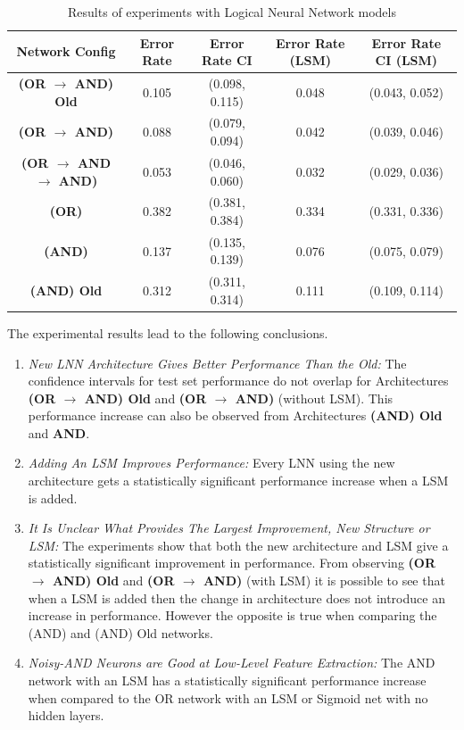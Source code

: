 \begin{table}[H]
	\begin{center}
		\begin{tabular}{| c | c | c | c | c |}
			\hline
			\textbf{Network Config} & \textbf{Error Rate} & \textbf{Error Rate CI} & \textbf{Error Rate (LSM)} & \textbf{Error Rate CI (LSM)}\\
			\hline
			\hline
			\textbf{(OR $\rightarrow$ AND) Old } & 0.105 & (0.098, 0.115) & 0.048 & (0.043, 0.052)\\
			\textbf{(OR $\rightarrow$ AND) } & 0.088 & (0.079, 0.094) & 0.042 & (0.039, 0.046)\\
			\textbf{(OR $\rightarrow$ AND $\rightarrow$ AND) } & 0.053 & (0.046, 0.060) & 0.032 & (0.029, 0.036)\\
			\textbf{(OR) } & 0.382 & (0.381, 0.384) & 0.334 & (0.331, 0.336)\\
			\textbf{(AND) } & 0.137 & (0.135, 0.139) & 0.076 & (0.075, 0.079)\\
			\textbf{(AND) Old} & 0.312 & (0.311, 0.314) & 0.111 & (0.109, 0.114)\\
			\hline
		\end{tabular}
	\end{center}
	\caption{Results of experiments with Logical Neural Network models}
	\label{tab:mnist-lnn-peformance-results}
\end{table}

The experimental results lead to the following conclusions.
\begin{enumerate}
	\item \textit{New LNN Architecture Gives Better Performance Than the Old:} The confidence intervals for test set performance do not overlap for Architectures \textbf{(OR $\rightarrow$ AND) Old} and \textbf{(OR $\rightarrow$ AND)} (without LSM). This performance increase can also be observed from Architectures \textbf{(AND) Old} and \textbf{AND}.
	
	\item \textit{Adding An LSM Improves Performance:} Every LNN using the new architecture gets a statistically significant performance increase when a LSM is added.

	\item \textit{It Is Unclear What Provides The Largest Improvement, New Structure or LSM:} The experiments show that both the new architecture and LSM give a statistically significant improvement in performance. From observing \textbf{(OR $\rightarrow$ AND) Old} and \textbf{(OR $\rightarrow$ AND)} (with LSM) it is possible to see that when a LSM is added then the change in architecture does not introduce an increase in performance. However the opposite is true when comparing the (AND) and (AND) Old networks.
	
	\item \textit{Noisy-AND Neurons are Good at Low-Level Feature Extraction:} The AND network with an LSM has a statistically significant performance increase when compared to the OR network with an LSM or Sigmoid net with no hidden layers.
\end{enumerate}

